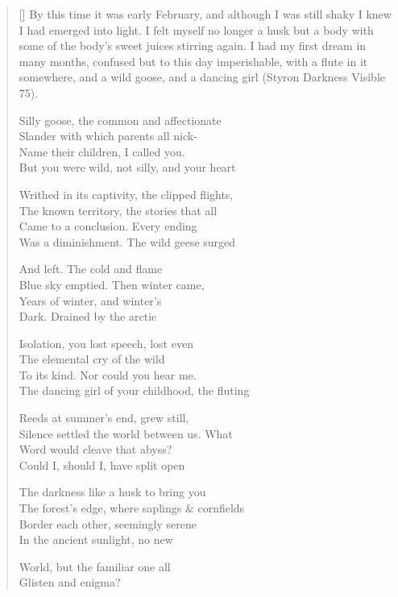 \label{ch:darknessvisible}
\settowidth{\versewidth}{The forest's edge, where saplings \& cornfields}
\begin{verse}[\versewidth]
By this time it was early February, and although I was still shaky I knew I had emerged into light. I felt myself no longer a husk but a body with some of the body's sweet juices stirring again. I had my first dream in many months, confused but to this day imperishable, with a flute in it somewhere, and a wild goose, and a dancing girl (Styron Darkness Visible 75).

Silly goose, the common and affectionate\\
Slander with which parents all nick-\\
Name their children, I called you.\\
But you were wild, not silly, and your heart

Writhed in its captivity, the clipped flights,\\
The known territory, the stories that all\\
Came to a conclusion. Every ending\\
Was a diminishment. The wild geese surged

And left. The cold and flame\\
Blue sky emptied.  Then winter came,\\
Years of winter, and winter's\\
Dark. Drained by the arctic

Isolation, you lost speech, lost even\\
The elemental cry of the wild\\
To its kind. Nor could you hear me.\\
The dancing girl of your childhood, the fluting

Reeds at summer's end, grew still,\\
Silence settled the world between us. What\\
Word would cleave that abyss?\\
Could I, should I, have split open

The darkness like a husk to bring you\\
The forest's edge, where saplings \& cornfields\\
Border each other, seemingly serene\\
In the ancient sunlight, no new

World, but the familiar one all\\
Glisten and enigma?
\end{verse}
